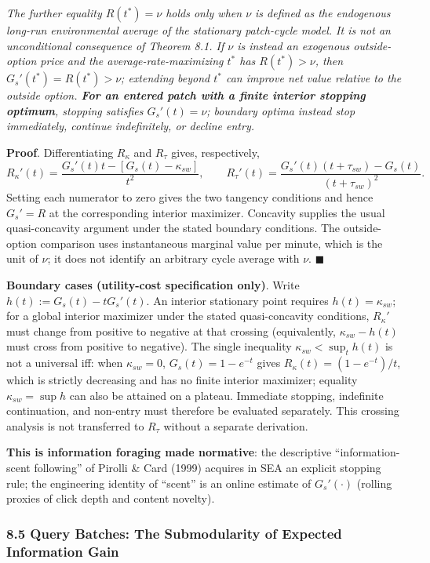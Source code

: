 \documentclass[
  11pt]{article}
\begin{document}
\emph{The further equality \(R(t^*)=\nu\) holds only when \(\nu\) is
defined as the endogenous long-run environmental average of the
stationary patch-cycle model. It is not an unconditional consequence of
Theorem 8.1. If \(\nu\) is instead an exogenous outside-option price and
the average-rate-maximizing \(t^*\) has \(R(t^*)>\nu\), then
\(G_s'(t^*)=R(t^*)>\nu\); extending beyond \(t^*\) can improve net value
relative to the outside option. \textbf{For an entered patch with a
finite interior stopping optimum}, stopping satisfies \(G_s'(t)=\nu\);
boundary optima instead stop immediately, continue indefinitely, or
decline entry.}

\textbf{Proof}. Differentiating \(R_\kappa\) and \(R_\tau\) gives,
respectively,
\[R_\kappa'(t)=\frac{G_s'(t)t-[G_s(t)-\kappa_{sw}]}{t^2},\qquad R_\tau'(t)=\frac{G_s'(t)(t+\tau_{sw})-G_s(t)}{(t+\tau_{sw})^2}.\]
Setting each numerator to zero gives the two tangency conditions and
hence \(G_s'=R\) at the corresponding interior maximizer. Concavity
supplies the usual quasi-concavity argument under the stated boundary
conditions. The outside-option comparison uses instantaneous marginal
value per minute, which is the unit of \(\nu\); it does not identify an
arbitrary cycle average with \(\nu\). \(\blacksquare\)

\textbf{Boundary cases (utility-cost specification only)}. Write
\(h(t):=G_s(t)-tG_s'(t)\). An interior stationary point requires
\(h(t)=\kappa_{sw}\); for a global interior maximizer under the stated
quasi-concavity conditions, \(R_\kappa'\) must change from positive to
negative at that crossing (equivalently, \(\kappa_{sw}-h(t)\) must cross
from positive to negative). The single inequality
\(\kappa_{sw}<\sup_t h(t)\) is not a universal iff: when
\(\kappa_{sw}=0\), \(G_s(t)=1-e^{-t}\) gives
\(R_\kappa(t)=(1-e^{-t})/t\), which is strictly decreasing and has no
finite interior maximizer; equality \(\kappa_{sw}=\sup h\) can also be
attained on a plateau. Immediate stopping, indefinite continuation, and
non-entry must therefore be evaluated separately. This crossing analysis
is not transferred to \(R_\tau\) without a separate derivation.

\textbf{This is information foraging made normative}: the descriptive
``information-scent following'' of Pirolli \& Card (1999) acquires in
SEA an explicit stopping rule; the engineering identity of ``scent'' is
an online estimate of \(G_s'(\cdot)\) (rolling proxies of click depth
and content novelty).

\subsubsection{8.5 Query Batches: The Submodularity of Expected
Information
Gain}\label{query-batches-the-submodularity-of-expected-information-gain}
\end{document}
